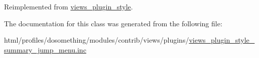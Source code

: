 Reimplemented from \hyperlink{classviews__plugin__style_aa52b618e91b11a7d10ad1feadbc891f1}{views\_\-plugin\_\-style}.

The documentation for this class was generated from the following file:\begin{DoxyCompactItemize}
\item 
html/profiles/dosomething/modules/contrib/views/plugins/\hyperlink{views__plugin__style__summary__jump__menu_8inc}{views\_\-plugin\_\-style\_\-summary\_\-jump\_\-menu.inc}\end{DoxyCompactItemize}

